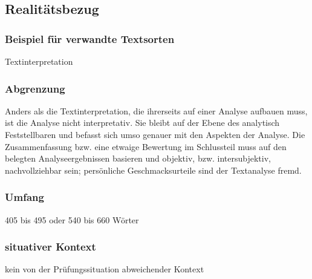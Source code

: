 \subsection{Realitätsbezug}
\subsubsection{Beispiel für verwandte Textsorten} Textinterpretation
\subsubsection{Abgrenzung} Anders als die Textinterpretation, die ihrerseits auf einer Analyse aufbauen muss, ist die Analyse nicht interpretativ. Sie bleibt auf der Ebene
des analytisch Feststellbaren und befasst sich umso genauer mit den
Aspekten der Analyse. Die Zusammenfassung bzw. eine etwaige
Bewertung im Schlussteil muss auf den belegten Analyseergebnissen
basieren und objektiv, bzw. intersubjektiv, nachvollziehbar sein;
persönliche Geschmacksurteile sind der Textanalyse fremd. 

\subsubsection{Umfang}405 bis 495 oder 540 bis 660 Wörter

\subsubsection{situativer Kontext} kein von der Prüfungssituation abweichender Kontext 
